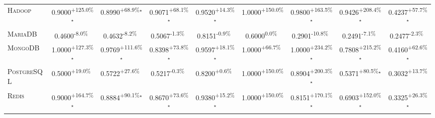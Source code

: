\begin{table}[htbp]
\begin{tabular}{l|cccc|cccc}
\textsc{Hadoop} & \cellcolor{green!30}0.9000\textsuperscript{+125.0\%}$^\star$ & \cellcolor{green!30}0.8990\textsuperscript{+68.9\%}$^\star$ & \cellcolor{green!30}0.9071\textsuperscript{+68.1\%}$^\star$ & \cellcolor{green!30}0.9520\textsuperscript{+14.3\%}$^\star$ & \cellcolor{green!30}1.0000\textsuperscript{+150.0\%}$^{\,\,\,}$ & \cellcolor{green!30}0.9800\textsuperscript{+163.5\%}$^\star$ & \cellcolor{green!30}0.9426\textsuperscript{+208.4\%}$^\star$ & \cellcolor{green!30}0.4237\textsuperscript{+57.7\%}$^\star$ \\
\textsc{MariaDB} & \cellcolor{red!30}0.4600\textsuperscript{-8.0\%}$^{\,\,\,}$ & \cellcolor{red!30}0.4632\textsuperscript{-8.2\%}$^{\,\,\,}$ & \cellcolor{red!30}0.5067\textsuperscript{-1.3\%}$^{\,\,\,}$ & \cellcolor{red!30}0.8151\textsuperscript{-0.9\%}$^{\,\,\,}$ & \cellcolor{red!30}0.6000\textsuperscript{0.0\%}$^{\,\,\,}$ & \cellcolor{red!30}0.2901\textsuperscript{-10.8\%}$^{\,\,\,}$ & \cellcolor{red!30}0.2491\textsuperscript{-7.1\%}$^{\,\,\,}$ & \cellcolor{red!30}0.2477\textsuperscript{-2.3\%}$^{\,\,\,}$ \\
\textsc{MongoDB} & \cellcolor{green!30}1.0000\textsuperscript{+127.3\%}$^\star$ & \cellcolor{green!30}0.9769\textsuperscript{+111.6\%}$^\star$ & \cellcolor{green!30}0.8398\textsuperscript{+73.8\%}$^\star$ & \cellcolor{green!30}0.9597\textsuperscript{+18.1\%}$^\star$ & \cellcolor{green!30}1.0000\textsuperscript{+66.7\%}$^{\,\,\,}$ & \cellcolor{green!30}1.0000\textsuperscript{+234.2\%}$^\star$ & \cellcolor{green!30}0.7808\textsuperscript{+215.2\%}$^\star$ & \cellcolor{green!30}0.4160\textsuperscript{+62.6\%}$^\star$ \\
\textsc{PostgreSQL} & \cellcolor{green!30}0.5000\textsuperscript{+19.0\%}$^{\,\,\,}$ & \cellcolor{green!30}0.5722\textsuperscript{+27.6\%}$^{\,\,\,}$ & \cellcolor{red!30}0.5217\textsuperscript{-0.3\%}$^{\,\,\,}$ & \cellcolor{green!30}0.8200\textsuperscript{+0.6\%}$^{\,\,\,}$ & \cellcolor{green!30}1.0000\textsuperscript{+150.0\%}$^{\,\,\,}$ & \cellcolor{green!30}0.8904\textsuperscript{+200.3\%}$^\star$ & \cellcolor{green!30}0.5371\textsuperscript{+80.5\%}$^\star$ & \cellcolor{green!30}0.3032\textsuperscript{+13.7\%}$^{\,\,\,}$ \\
\textsc{Redis} & \cellcolor{green!30}0.9000\textsuperscript{+164.7\%}$^\star$ & \cellcolor{green!30}0.8884\textsuperscript{+90.1\%}$^\star$ & \cellcolor{green!30}0.8670\textsuperscript{+73.6\%}$^\star$ & \cellcolor{green!30}0.9380\textsuperscript{+15.2\%}$^\star$ & \cellcolor{green!30}1.0000\textsuperscript{+150.0\%}$^{\,\,\,}$ & \cellcolor{green!30}0.8151\textsuperscript{+170.1\%}$^\star$ & \cellcolor{green!30}0.6903\textsuperscript{+152.0\%}$^\star$ & \cellcolor{green!30}0.3325\textsuperscript{+26.3\%}$^\star$ \\

\end{tabular}
\end{table}
